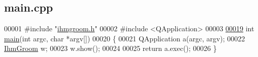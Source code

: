 \hypertarget{main_8cpp_source}{}\subsection{main.\+cpp}

\begin{DoxyCode}
00001 \textcolor{preprocessor}{#include "\hyperlink{ihmgroom_8h}{ihmgroom.h}"}
00002 \textcolor{preprocessor}{#include <QApplication>}
00003 
\hyperlink{main_8cpp_ae0665038b72011f5c680c660fcb59459}{00019} \textcolor{keywordtype}{int} \hyperlink{main_8cpp_ae0665038b72011f5c680c660fcb59459}{main}(\textcolor{keywordtype}{int} argc, \textcolor{keywordtype}{char} *argv[])
00020 \{
00021     QApplication a(argc, argv);
00022     \hyperlink{class_ihm_groom}{IhmGroom} w;
00023     w.show();
00024 
00025     \textcolor{keywordflow}{return} a.exec();
00026 \}
\end{DoxyCode}
